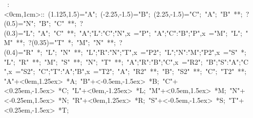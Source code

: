 
%

\hbox{
\xy    <1cm,0cm>:<0cm,1cm>::
       (1.125,1.5)="A"; (-2.25,-1.5)="B"; (2.25,-1.5)="C"; 
       "A"; "B" **\dir{-}; ?(0.5)="N";
       "B"; "C" **\dir{-}; ?(0.3)="L";
       "A"; "C" **\dir{-};
       {"A";"L":"C";"N",x} ="P";   {"A";"C":"B";"P",x} ="M";
%
%
       "L"; "M" **; ?(0.35)="T" *{\bullet};
       "M"; "N" **; ?(0.4)="R" *{\bullet};
       "L"; "N" **;
       {"L";"R":"N";"T",x} ="P2";   {"L";"N":"M";"P2",x} ="S" *{\bullet};
%
       "L"; "R" **\dir{-};
       "M"; "S" **\dir{-};
       "N"; "T" **\dir{-};
%
       {"A";"R":"B";"C",x} ="R2";   {"B";"S":"A";"C",x} ="S2";   {"C";"T":"A";"B",x} ="T2";
       "A"; "R2" **\dir{-};
       "B"; "S2" **\dir{-};
       "C"; "T2" **\dir{-};
%
       "A"+<0em,1.25ex> *{A}; 
       "B"+<-0.5em,-1.5ex> *{B}; 
       "C"+<0.25em,-1.5ex> *{C}; 
%
       "L"+<0em,-1.25ex> *{L}; 
       "M"+<0.5em,1.5ex> *{M}; 
       "N"+<-0.25em,1.5ex> *{N}; 
%
       "R"+<0em,1.25ex> *{R}; 
       "S"+<-0.5em,-1.5ex> *{S}; 
       "T"+<0.25em,-1.5ex> *{T}; 
\endxy}


